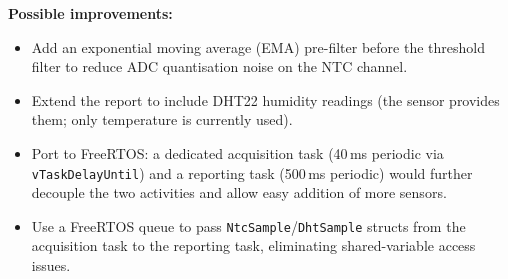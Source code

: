 \documentclass[12pt]{article}
\begin{document}
\textbf{Possible improvements:}
\begin{itemize}
    \item Add an exponential moving average (EMA) pre-filter before the threshold filter to reduce ADC quantisation noise on the NTC channel.
    \item Extend the report to include DHT22 humidity readings (the sensor provides them; only temperature is currently used).
    \item Port to FreeRTOS: a dedicated acquisition task (40\,ms periodic via \texttt{vTaskDelayUntil}) and a reporting task (500\,ms periodic) would further decouple the two activities and allow easy addition of more sensors.
    \item Use a FreeRTOS queue to pass \texttt{NtcSample}/\texttt{DhtSample} structs from the acquisition task to the reporting task, eliminating shared-variable access issues.
\end{itemize}

\end{document}

